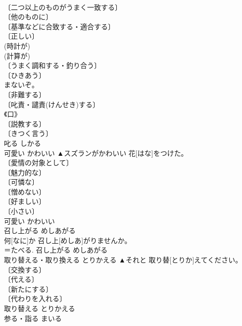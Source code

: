 \documentclass[8pt]{extreport}
\begin{document}
\begin{CJK}{UTF8}{min}
\\	〔二つ以上のものがうまく一致する〕 
\\	〔他のものに〕 
\\	〔基準などに合致する・適合する〕 
\\	〔正しい〕 
\\	(時計が) 
\\	(計算が) 
\\	〔うまく調和する・釣り合う〕 
\\	〔ひきあう〕 
\\	[＝ひきあう 
\\	合う	あう	
\\	吃驚	びっくり	▲びっくりするほど。	
\\	～する 〔物音や景色に〕 
\\	〔不意打ちされて〕 
\\	〔意外に感じて〕 
\\	吃驚	びっくり	
\\	叱る	しかる	▲そんなことをするとしかられるだけじゃ 済[す]まないぞ。	
\\	〔非難する〕 
\\	〔叱責・譴責(けんせき)する〕 
\\	《口》 
\\	〔説教する〕 
\\	〔きつく言う〕 
\\	叱る	しかる	
\\	可愛い	かわいい	▲スズランがかわいい 花[はな]をつけた。	
\\	〔愛情の対象として〕 
\\	〔魅力的な〕 
\\	〔可憐な〕 
\\	〔憎めない〕 
\\	〔好ましい〕 
\\	〔小さい〕 
\\	可愛い	かわいい	
\\	召し上がる	めしあがる	
\\	何[なに]か 召し上[めしあ]がりませんか。	
\\	＝たべる.	召し上がる	めしあがる	
\\	取り替える・取り換える	とりかえる	▲それと 取り替[とりか]えてください。	
\\	〔交換する〕 
\\	〔代える〕 
\\	〔新たにする〕 
\\	〔代わりを入れる〕 
\\	取り替える	とりかえる	
\\	参る・詣る	まいる	

\end{CJK}
\end{document}

